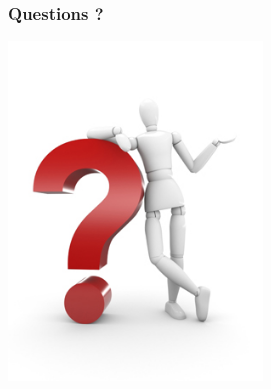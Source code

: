 \documentclass{beamer}
\begin{document}
    \begin{frame}
        \frametitle{Questions ?}
        \centering
        \includegraphics[height=9cm]{questions}
    \end{frame}
\end{document}

